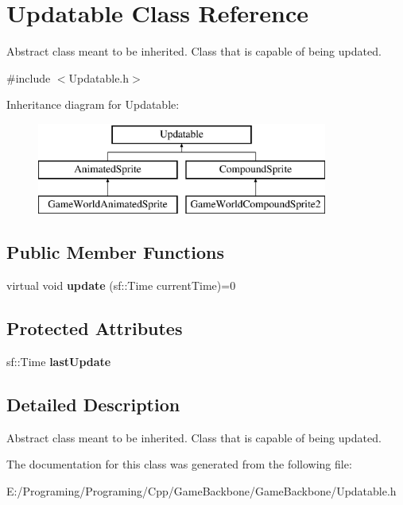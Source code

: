 \hypertarget{class_updatable}{}\section{Updatable Class Reference}
\label{class_updatable}


Abstract class meant to be inherited. Class that is capable of being updated.  




{\ttfamily \#include $<$Updatable.\+h$>$}

Inheritance diagram for Updatable\+:\begin{figure}[H]
\begin{center}
\leavevmode
\includegraphics[height=3.000000cm]{class_updatable}
\end{center}
\end{figure}
\subsection*{Public Member Functions}
\begin{DoxyCompactItemize}
\item 
\mbox{\label{class_updatable_a60644f5011197f7b371379edeb016fe9}} 
virtual void {\bfseries update} (sf\+::\+Time current\+Time)=0
\end{DoxyCompactItemize}
\subsection*{Protected Attributes}
\begin{DoxyCompactItemize}
\item 
\mbox{\label{class_updatable_aa34a7210d368ca86c9a49b6cf75aa978}} 
sf\+::\+Time {\bfseries last\+Update}
\end{DoxyCompactItemize}


\subsection{Detailed Description}
Abstract class meant to be inherited. Class that is capable of being updated. 



The documentation for this class was generated from the following file\+:\begin{DoxyCompactItemize}
\item 
E\+:/\+Programing/\+Programing/\+Cpp/\+Game\+Backbone/\+Game\+Backbone/Updatable.\+h\end{DoxyCompactItemize}
